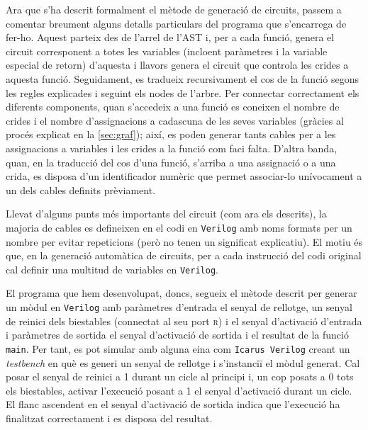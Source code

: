 Ara que s'ha descrit formalment el mètode de generació de circuits, passem a 
comentar breument alguns detalls particulars del programa que s'encarrega de 
fer-ho. Aquest parteix des de l'arrel de l'AST i, per a cada funció, genera 
el circuit corresponent a totes les variables (incloent paràmetres i la 
variable especial de retorn) d'aquesta i llavors genera el circuit que 
controla les crides a aquesta funció. Seguidament, es tradueix recursivament 
el cos de la funció segons les regles explicades i seguint els nodes de 
l'arbre. Per connectar correctament els diferents components, quan s'accedeix 
a una funció es coneixen el nombre de crides i el nombre d'assignacions a 
cadascuna de les seves variables (gràcies al procés explicat en la 
\autoref{sec:graf}); així, es poden generar tants cables per a les 
assignacions a variables i les crides a la funció com faci falta. D'altra 
banda, quan, en la traducció del cos d'una funció, s'arriba a una assignació o 
a una crida, es disposa d'un identificador numèric que permet associar-lo 
unívocament a un dels cables definits prèviament.

Llevat d'alguns punts més importants del circuit (com ara els descrits), la 
majoria de cables es defineixen en el codi en \texttt{Verilog} amb noms 
formats per un nombre per evitar repeticions (però no tenen un significat 
explicatiu). El motiu és que, en la generació automàtica de circuits, per a 
cada instrucció del codi original cal definir una multitud de variables en 
\texttt{Verilog}.

El programa que hem desenvolupat, doncs, segueix el mètode descrit per generar 
un mòdul en \texttt{Verilog} amb paràmetres d'entrada el senyal de rellotge, 
un senyal de reinici dels biestables (connectat al seu port \textsc{r}) i 
el senyal d'activació d'entrada i paràmetres de sortida el senyal d'activació 
de sortida i el resultat de la funció \texttt{main}. Per tant, es pot simular 
amb alguna eina com \texttt{Icarus Verilog} creant un \textit{testbench} en 
què es generi un senyal de rellotge i s'instanciï el mòdul generat. Cal posar 
el senyal de reinici a 1 durant un cicle al principi i, un cop posats a 0 
tots els biestables, activar l'execució posant a 1 el senyal d'activació 
durant un cicle. El flanc ascendent en el senyal d'activació de sortida 
indica que l'execució ha finalitzat correctament i es disposa del resultat.


